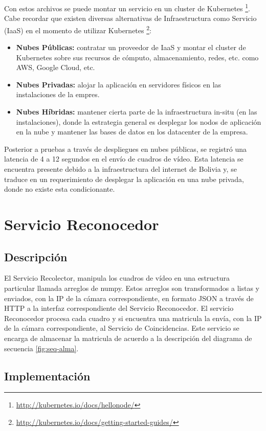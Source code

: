 Con estos archivos se puede montar un servicio en un cluster de Kubernetes \footnote{\url{http://kubernetes.io/docs/hellonode/}}. Cabe recordar que existen diversas alternativas de Infraestructura como Servicio (IaaS) en el momento de utilizar Kubernetes \footnote{\url{http://kubernetes.io/docs/getting-started-guides/}}:
\begin{itemize}
\item \textbf{Nubes Públicas:} contratar un proveedor de IaaS y montar el cluster de Kubernetes sobre sus recursos de cómputo, almacenamiento, redes, etc. como AWS, Google Cloud, etc.
\item \textbf{Nubes Privadas:} alojar la aplicación en servidores físicos en las instalaciones de la empres.
\item \textbf{Nubes Híbridas:} mantener cierta parte de la infraestructura in-situ (en las instalaciones), donde la estrategia general es desplegar los nodos de aplicación en la nube y mantener las bases de datos en los datacenter de la empresa.
 \end{itemize}
Posterior a pruebas a través de despliegues en nubes públicas, se registró una latencia de 4 a 12 segundos en el envío de cuadros de vídeo. Esta latencia se encuentra presente debido a la infraestructura del internet de Bolivia y, se traduce en un requerimiento de desplegar la aplicación en una nube privada, donde no existe esta condicionante.

\section{Servicio Reconocedor}
\subsection{Descripción}

El Servicio Recolector, manipula los cuadros de vídeo en una estructura particular llamada arreglos de numpy. Estos arreglos son transformados a listas y enviados, con la IP de la cámara correspondiente, en formato JSON a través de HTTP a la interfaz correspondiente del Servicio Reconocedor.
El servicio Reconocedor procesa cada cuadro y si encuentra una matricula la envía, con la IP de la cámara correspondiente, al Servicio de Coincidencias. Este servicio se encarga de almacenar la matricula de acuerdo a la descripción del diagrama de secuencia \ref{fig:seq-alma}.

\subsection{Implementación}
